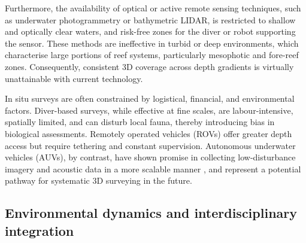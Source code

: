 Furthermore, the availability of optical or active remote sensing techniques, such as underwater photogrammetry or bathymetric LIDAR, is restricted to shallow and optically clear waters, and risk-free zones for the diver or robot supporting the sensor. These methods are ineffective in turbid or deep environments, which characterise large portions of reef systems, particularly mesophotic and fore-reef zones. Consequently, consistent 3D coverage across depth gradients is virtually unattainable with current technology.

In situ surveys are often constrained by logistical, financial, and environmental factors. Diver-based surveys, while effective at fine scales, are labour-intensive, spatially limited, and can disturb local fauna, thereby introducing bias in biological assessments. Remotely operated vehicles (ROVs) offer greater depth access but require tethering and constant supervision. Autonomous underwater vehicles (AUVs), by contrast, have shown promise in collecting low-disturbance imagery and acoustic data in a more scalable manner \cite{GonzalezRivero2016,Modasshir2018}, and represent a potential pathway for systematic 3D surveying in the future.

\subsection{Environmental dynamics and interdisciplinary integration}


